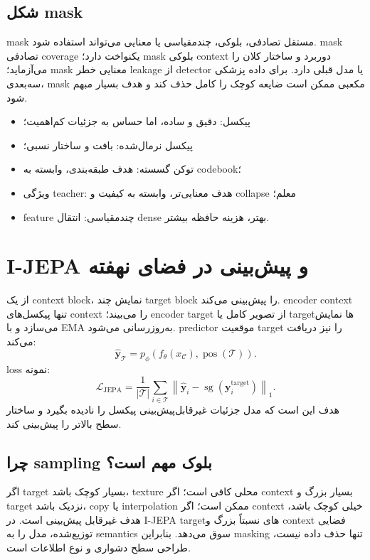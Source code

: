 \documentclass[12pt,openany,oneside]{book}
\newcommand{\norm}[1]{\left\lVert #1\right\rVert}
\newcommand{\abs}[1]{\left\lvert #1\right\rvert}
\newcommand{\vect}[1]{\bm{#1}}
\begin{document}
\subsection{شکل mask}
mask مستقل تصادفی، بلوکی، چندمقیاسی یا معنایی می‌تواند استفاده شود. mask تصادفی coverage یکنواخت دارد؛ mask بلوکی context دوربرد و ساختار کلان را می‌آزماید؛ mask معنایی خطر leakage از detector یا مدل قبلی دارد. برای داده پزشکی سه‌بعدی، mask مکعبی ممکن است ضایعه کوچک را کامل حذف کند و هدف بسیار مبهم شود.

\begin{keybox}
\begin{itemize}
\item پیکسل: دقیق و ساده، اما حساس به جزئیات کم‌اهمیت؛
\item پیکسل نرمال‌شده: بافت و ساختار نسبی؛
\item توکن گسسته: هدف طبقه‌بندی، وابسته به codebook؛
\item ویژگی teacher: هدف معنایی‌تر، وابسته به کیفیت و collapse معلم؛
\item feature چندمقیاسی: انتقال dense بهتر، هزینه حافظه بیشتر.
\end{itemize}
\end{keybox}

\section{I-JEPA و پیش‌بینی در فضای نهفته}
 از یک context block، نمایش چند target block را پیش‌بینی می‌کند. encoder context تنها پیکسل‌های context را می‌بیند؛ encoder target از تصویر کامل یا targetها نمایش می‌سازد و با EMA به‌روزرسانی می‌شود. predictor موقعیت target را نیز دریافت می‌کند:
\begin{equation}
\widehat{\vect y}_{\mathcal T}
=p_\phi(f_\theta(x_{\mathcal C}),\operatorname{pos}(\mathcal T)).
\end{equation}
loss نمونه:
\begin{equation}
\mathcal L_{\mathrm{JEPA}}
=\frac{1}{\abs{\mathcal T}}\sum_{i\in\mathcal T}
\norm{\widehat{\vect y}_i-\operatorname{sg}(\vect y_i^{\mathrm{target}})}_1.
\end{equation}
هدف این است که مدل جزئیات غیرقابل‌پیش‌بینی پیکسل را نادیده بگیرد و ساختار سطح بالاتر را پیش‌بینی کند.

\subsection{چرا sampling بلوک مهم است؟}
اگر target بسیار کوچک باشد، texture محلی کافی است؛ اگر context بسیار بزرگ و target نزدیک باشد، copy یا interpolation ممکن است؛ اگر context خیلی کوچک باشد، هدف غیرقابل پیش‌بینی است. در I-JEPA targetهای نسبتاً بزرگ و context فضایی توزیع‌شده، مدل را به semantics سوق می‌دهد. بنابراین masking تنها حذف داده نیست، طراحی سطح دشواری و نوع اطلاعات است.
\end{document}
